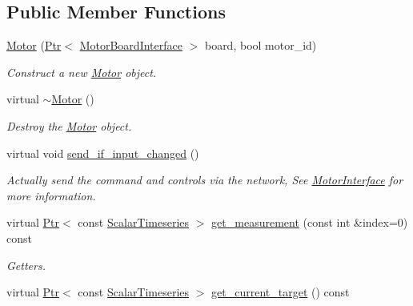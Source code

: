\subsection*{Public Member Functions}
\begin{DoxyCompactItemize}
\item 
\hyperlink{classblmc__drivers_1_1Motor_a923be3c8e5027cdead1006f3878b6ec3}{Motor} (\hyperlink{classblmc__drivers_1_1MotorInterface_ae31f230b9da3674a05543023c90b124c}{Ptr}$<$ \hyperlink{classblmc__drivers_1_1MotorBoardInterface}{Motor\+Board\+Interface} $>$ board, bool motor\+\_\+id)
\begin{DoxyCompactList}\small\item\em Construct a new \hyperlink{classblmc__drivers_1_1Motor}{Motor} object. \end{DoxyCompactList}\item 
virtual \hyperlink{classblmc__drivers_1_1Motor_ad93b64d54b40ff12df7081e009c71239}{$\sim$\+Motor} ()
\begin{DoxyCompactList}\small\item\em Destroy the \hyperlink{classblmc__drivers_1_1Motor}{Motor} object. \end{DoxyCompactList}\item 
\mbox{\label{classblmc__drivers_1_1Motor_acf7389e09918c1955986a641efd4f032}} 
virtual void \hyperlink{classblmc__drivers_1_1Motor_acf7389e09918c1955986a641efd4f032}{send\+\_\+if\+\_\+input\+\_\+changed} ()
\begin{DoxyCompactList}\small\item\em Actually send the command and controls via the network, See \hyperlink{classblmc__drivers_1_1MotorInterface}{Motor\+Interface} for more information. \end{DoxyCompactList}\item 
virtual \hyperlink{classblmc__drivers_1_1MotorInterface_ae31f230b9da3674a05543023c90b124c}{Ptr}$<$ const \hyperlink{classblmc__drivers_1_1MotorInterface_a49b8fc916b9f9debbd7b0988463db5cd}{Scalar\+Timeseries} $>$ \hyperlink{classblmc__drivers_1_1Motor_a0ff1a1b5eb5da4791cc27879e761eb22}{get\+\_\+measurement} (const int \&index=0) const
\begin{DoxyCompactList}\small\item\em Getters. \end{DoxyCompactList}\item 
virtual \hyperlink{classblmc__drivers_1_1MotorInterface_ae31f230b9da3674a05543023c90b124c}{Ptr}$<$ const \hyperlink{classblmc__drivers_1_1MotorInterface_a49b8fc916b9f9debbd7b0988463db5cd}{Scalar\+Timeseries} $>$ \hyperlink{classblmc__drivers_1_1Motor_ace26e74e3c8072c8bee867a2a0a7e013}{get\+\_\+current\+\_\+target} () const

\end{DoxyCompactItemize}
